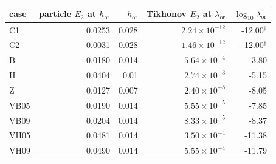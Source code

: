 \begin{tabular}{lrrrr}
\toprule
case & particle $E_2$ at $h_{\mathrm{or}}$ & $h_{\mathrm{or}}$ & Tikhonov $E_2$ at $\lambda_{\mathrm{or}}$ & $\log_{10}\lambda_{\mathrm{or}}$ \\
\midrule
C1 & 0.0253 & 0.028 & $2.24\times10^{-12}$ & -12.00$^{\dagger}$ \\
C2 & 0.0031 & 0.028 & $1.46\times10^{-12}$ & -12.00$^{\dagger}$ \\
B & 0.0180 & 0.014 & $5.64\times10^{-4}$ & -3.80 \\
H & 0.0404 & 0.01 & $2.74\times10^{-3}$ & -5.15 \\
Z & 0.0127 & 0.007 & $2.40\times10^{-8}$ & -8.05 \\
VB05 & 0.0190 & 0.014 & $5.55\times10^{-5}$ & -7.85 \\
VB09 & 0.0204 & 0.014 & $8.33\times10^{-5}$ & -8.37 \\
VH05 & 0.0481 & 0.014 & $3.50\times10^{-4}$ & -11.38 \\
VH09 & 0.0490 & 0.014 & $5.55\times10^{-4}$ & -11.79 \\
\bottomrule
\end{tabular}
